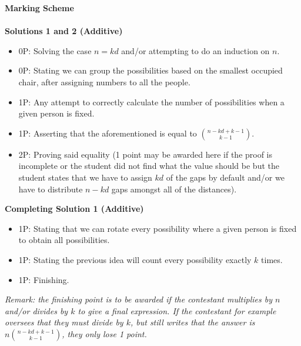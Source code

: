 { \textbf{Marking Scheme}\\
  \\
 \textbf{Solutions 1 and 2 (Additive)} 
 
 \begin{itemize}
 \item 0P: Solving the case $n = kd$ and/or attempting to do an induction on $n$.
 \item 0P: Stating we can group the possibilities based on the smallest occupied chair, after assigning numbers to all the people.
     \item 1P: Any attempt to correctly calculate the number of possibilities when a given person is fixed.
     \item 1P: Asserting that the aforementioned is equal to $\binom{n-kd+k-1}{k-1}$.  
     \item 2P: Proving said equality (1 point may be awarded here if the proof is incomplete or the student did not find what the value should be but the student states that we have to assign $kd$ of the gaps by default and/or we have to distribute $n-kd$ gaps amongst all of the distances).
\end{itemize}

\textbf{Completing Solution 1 (Additive)}
\begin{itemize}
     \item 1P: Stating that we can rotate every possibility where a given person is fixed to obtain all possibilities.
     \item 1P: Stating the previous idea will count every possibility exactly $k$ times. 
     \item 1P: Finishing.
 \end{itemize}
 
 \emph{Remark: the finishing point is to be awarded if the contestant multiplies by $n$ and/or divides by $k$ to give a final expression. If the contestant for example oversees that they must divide by $k$, but still writes that the answer is $n\binom{n-kd+k-1}{k-1}$, they only lose 1 point.}
 
}

